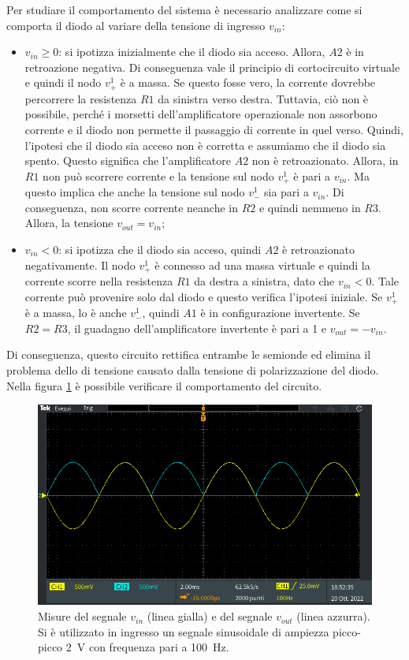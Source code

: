 \noindent
Per studiare il comportamento del sistema è necessario analizzare come si comporta il diodo al variare della tensione di ingresso $v_{in}$:
\begin{itemize}
	\item $v_{in} \geq 0$: si ipotizza inizialmente che il diodo sia acceso. Allora, $A2$  è in retroazione negativa. Di conseguenza vale il principio di cortocircuito virtuale e quindi il nodo $v_{+}^1$ è a massa. Se questo fosse vero, la corrente dovrebbe percorrere la resistenza $R1$ da sinistra verso destra. Tuttavia, ciò non è possibile, perché i morsetti dell'amplificatore operazionale non assorbono corrente e il diodo non permette il passaggio di corrente in quel verso. Quindi, l'ipotesi che il diodo sia acceso non è corretta e assumiamo che il diodo sia spento. Questo significa che l'amplificatore $A2$ non è retroazionato. Allora, in $R1$ non può scorrere corrente e la tensione sul nodo $v_{+}^1$ è pari a $v_{in}$. Ma questo implica che anche la tensione sul nodo $v_{-}^1$ sia pari a $v_{in}$. Di conseguenza, non scorre corrente neanche in $R2$ e quindi nemmeno in $R3$. Allora, la tensione $v_{out} = v_{in}$;
	\item $v_{in} < 0$: si ipotizza che il diodo sia acceso, quindi $A2$ è retroazionato negativamente. Il nodo $v_{+}^1$ è connesso ad una massa virtuale e quindi la corrente scorre nella resistenza $R1$ da destra a sinistra, dato che $v_{in} < 0$. Tale corrente può provenire solo dal diodo e questo verifica l'ipotesi iniziale. Se $v_{+}^1$ è a massa, lo è anche $v_{-}^1$, quindi $A1$ è in configurazione invertente. Se $R2 = R3$, il guadagno dell'amplificatore invertente è pari a 1 e $v_{out} = -v_{in}$.
\end{itemize}
Di conseguenza, questo circuito rettifica entrambe le semionde ed elimina il problema dello  di tensione causato dalla tensione di polarizzazione del diodo. Nella figura \ref{fig:uscita_circuito_1} è possibile verificare il comportamento del circuito.
\begin{figure}[h]
	\centering
	\includegraphics[width=\linewidth]{./ImageFiles/Laboratorio 3/TEK00001.PNG}
	\caption{Misure del segnale $v_{in}$ (linea gialla) e del segnale $v_{out}$ (linea azzurra). Si è utilizzato in ingresso un segnale sinusoidale di ampiezza picco-picco \SI{2}{\volt} con frequenza pari a \SI{100}{\hertz}.}
	\label{fig:uscita_circuito_1}
\end{figure}
